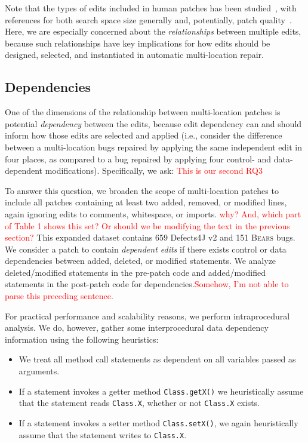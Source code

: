 \documentclass[10pt, conference]{IEEEtran}
\newcommand\todo[1]{\textcolor{red}{#1}}
\newcommand\bears{\textsc{Bears}\xspace}
\begin{document}
Note that the types of edits included in human patches has been
studied~\cite{examples}, with references for both search space size generally
and, potentially, patch quality~\cite{moreexamples}.  Here, we are especially
concerned about the 
\emph{relationships} between multiple edits, because such relationships have
key implications for how edits should be designed, selected, and instantiated 
in automatic multi-location repair. 

\subsection{Dependencies}

One of the dimensions of the relationship between multi-location patches is potential
\emph{dependency} between the edits, because edit dependency can and should
inform how those edits are selected and applied (i.e., consider the difference
between a multi-location
bugs repaired by applying the same independent edit in four places, as
compared to a bug repaired by applying  four control- and data-dependent
modifications).  Specifically, we ask:
\todo{This is our second RQ3}

To answer this question, we broaden the scope of multi-location patches to 
include all patches containing at least two added, removed, or modified lines, 
again ignoring edits to comments, whitespace, or imports.
\todo{why?  And, which part of Table 1 shows this set?  Or should we be modifying the
text in the previous section?}
This expanded dataset contains 659 Defects4J v2 and 151 \bears bugs.
We consider a patch to contain \emph{dependent edits} if there exists 
control or data dependencies between added, deleted, or modified statements.
We analyze deleted/modified statements in the pre-patch code 
and added/modified statements in the post-patch code for
dependencies.\todo{Somehow, I'm not able to parse this preceding sentence.}
  
For practical performance and scalability reasons, 
we perform intraprocedural analysis. 
We do, however, gather some interprocedural data dependency information 
using the following heuristics:
\begin{itemize}
	\item We treat all method call statements as dependent on all variables
          passed as arguments. 
	\item If a statement invokes a getter method \texttt{Class.getX()} 
          we heuristically  assume that the statement reads \texttt{Class.X},
          whether or not \texttt{Class.X} exists.
	\item If a statement invokes a setter method \texttt{Class.setX()}, 
	we again heuristically assume that the statement writes to \texttt{Class.X}. 
\end{itemize}
\end{document}

